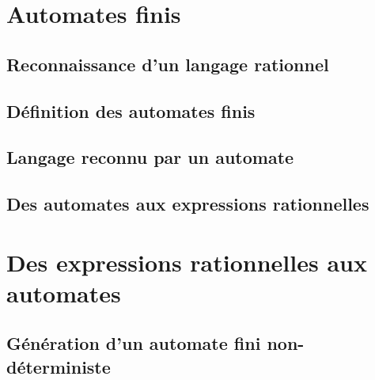 \section{Automates finis}
 
\subsection{Reconnaissance d'un langage rationnel}




 
\subsection{Définition des automates finis}





 
\subsection{Langage reconnu par un automate}







 
\subsection{Des automates aux expressions rationnelles}






 
\section{Des expressions rationnelles aux automates}
 
\subsection{Génération d'un automate fini non-déterministe}






 
